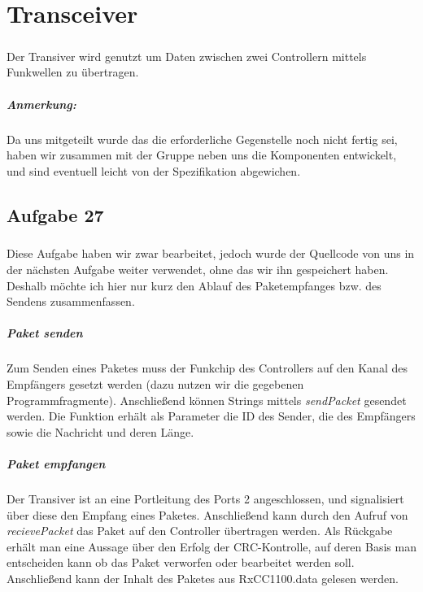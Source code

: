 \chapter{Transceiver}

\paragraph*{}
Der Transiver wird genutzt um Daten zwischen zwei Controllern mittels Funkwellen zu übertragen.

\paragraph*{Anmerkung:} Da uns mitgeteilt wurde das die erforderliche Gegenstelle noch nicht fertig sei, haben wir zusammen mit der Gruppe neben uns die Komponenten entwickelt, und sind eventuell leicht von der Spezifikation abgewichen. 

\section*{Aufgabe 27}

\paragraph*{}
Diese Aufgabe haben wir zwar bearbeitet, jedoch wurde der Quellcode von uns in der nächsten Aufgabe weiter verwendet, ohne das wir ihn gespeichert haben. Deshalb möchte ich hier nur kurz den Ablauf des Paketempfanges bzw. des Sendens zusammenfassen.

\paragraph*{Paket senden}
Zum Senden eines Paketes muss der Funkchip des Controllers auf den Kanal des Empfängers gesetzt werden (dazu nutzen wir die gegebenen Programmfragmente). Anschließend können Strings mittels {\em sendPacket} gesendet werden. Die Funktion erhält als Parameter die ID des Sender, die des Empfängers sowie die Nachricht und deren Länge. 

\paragraph*{Paket empfangen}
Der Transiver ist an eine Portleitung des Ports 2 angeschlossen, und signalisiert über diese den Empfang eines Paketes. Anschließend kann durch den Aufruf von {\em recievePacket} das Paket auf den Controller übertragen werden. Als Rückgabe erhält man eine Aussage über den Erfolg der CRC-Kontrolle, auf deren Basis man entscheiden kann ob das Paket verworfen oder bearbeitet werden soll. Anschließend kann der Inhalt des Paketes aus RxCC1100.data gelesen werden.

